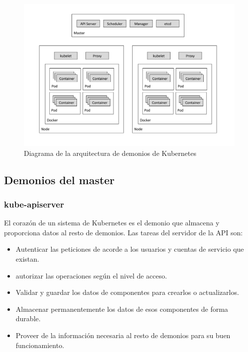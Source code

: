 \begin{figure}[H]
    \centering
    \includegraphics[width=\textwidth]{../images/kubernetes/arch.png}
    \caption{Diagrama de la arquitectura de demonios de Kubernetes \protect\cite{k8sarch}}
    \label{fig:k8s-arch}
\end{figure}

\subsection{Demonios del master}
\label{subsec:k8s-demonios-master}

\subsubsection{kube-apiserver}
\label{subsubsec:k8s-apiserver}

El corazón de un sistema de Kubernetes es el demonio que almacena y proporciona datos al resto de demonios. Las tareas del servidor de la API son:
\begin{itemize}
    \item Autenticar las peticiones de acorde a los usuarios y cuentas de servicio que existan.
    \item autorizar las operaciones según el nivel de acceso.
    \item Validar y guardar los datos de componentes para crearlos o actualizarlos.
    \item Almacenar permanentemente los datos de esos componentes de forma durable.
    \item Proveer de la información necesaria al resto de demonios para su buen funcionamiento.
\end{itemize}

